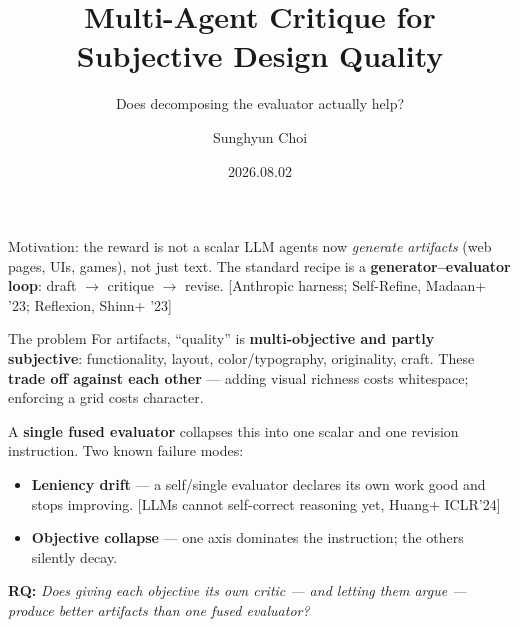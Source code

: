 \documentclass[aspectratio=169,10pt]{beamer}
\title{Multi-Agent Critique for Subjective Design Quality}
\subtitle{Does decomposing the evaluator actually help?}
\date{2026.08.02}
\author{Sunghyun Choi}
\newcommand{\cit}[1]{{\scriptsize\color{gray60}[#1]}}
\newcommand{\hl}[1]{\textbf{\color{navymain}#1}}
\newcommand{\bad}[1]{\textbf{\color{accentred}#1}}
\begin{document}
\begin{frame}{Motivation: the reward is not a scalar}
\small
LLM agents now \emph{generate artifacts} (web pages, UIs, games), not just text.
The standard recipe is a \hl{generator--evaluator loop}: draft $\rightarrow$ critique $\rightarrow$ revise.
\cit{Anthropic harness; Self-Refine, Madaan+ '23; Reflexion, Shinn+ '23}

\vspace{0.35em}
\begin{block}{The problem}
For artifacts, ``quality'' is \hl{multi-objective and partly subjective}:
functionality, layout, color/typography, originality, craft.
These \bad{trade off against each other} --- adding visual richness costs whitespace;
enforcing a grid costs character.
\end{block}

\vspace{0.2em}
A \hl{single fused evaluator} collapses this into one scalar and one revision instruction.
Two known failure modes:
\begin{itemize}\itemsep0.15em
  \item \bad{Leniency drift} --- a self/single evaluator declares its own work good and stops improving.
        \cit{LLMs cannot self-correct reasoning yet, Huang+ ICLR'24}
  \item \bad{Objective collapse} --- one axis dominates the instruction; the others silently decay.
\end{itemize}

\vspace{0.35em}
\centering
\textbf{RQ:} \emph{Does giving each objective its own critic --- and letting them argue ---
produce better artifacts than one fused evaluator?}
\end{frame}
\end{document}
